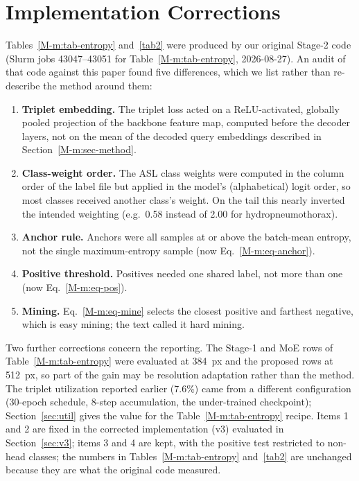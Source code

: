 \documentclass[conference]{IEEEtran}
\begin{document}
\section{Implementation Corrections}
\label{s:corr}\label{sec:corrections}
Tables~\ref{M-m:tab-entropy} and~\ref{tab2} were produced by our original Stage-2 code (Slurm jobs 43047--43051 for Table~\ref{M-m:tab-entropy}, 2026-08-27). An audit of that code against this paper found five differences, which we list rather than re-describe the method around them:
\begin{enumerate}
\item \textbf{Triplet embedding.} The triplet loss acted on a ReLU-activated, globally pooled projection of the backbone feature map, computed before the decoder layers, not on the mean of the decoded query embeddings described in Section~\ref{M-m:sec-method}.
\item \textbf{Class-weight order.} The ASL class weights were computed in the column order of the label file but applied in the model's (alphabetical) logit order, so most classes received another class's weight. On the tail this nearly inverted the intended weighting (e.g.\ 0.58 instead of 2.00 for hydropneumothorax).
\item \textbf{Anchor rule.} Anchors were all samples at or above the batch-mean entropy, not the single maximum-entropy sample (now Eq.~\ref{M-m:eq-anchor}).
\item \textbf{Positive threshold.} Positives needed one shared label, not more than one (now Eq.~\ref{M-m:eq-pos}).
\item \textbf{Mining.} Eq.~\ref{M-m:eq-mine} selects the closest positive and farthest negative, which is easy mining; the text called it hard mining.
\end{enumerate}
Two further corrections concern the reporting. The Stage-1 and MoE rows of Table~\ref{M-m:tab-entropy} were evaluated at 384~px and the proposed rows at 512~px, so part of the gain may be resolution adaptation rather than the method. The triplet utilization reported earlier (7.6\%) came from a different configuration (30-epoch schedule, 8-step accumulation, the under-trained checkpoint); Section~\ref{sec:util} gives the value for the Table~\ref{M-m:tab-entropy} recipe. Items 1 and 2 are fixed in the corrected implementation (v3) evaluated in Section~\ref{sec:v3}; items 3 and 4 are kept, with the positive test restricted to non-head classes; the numbers in Tables~\ref{M-m:tab-entropy} and~\ref{tab2} are unchanged because they are what the original code measured.
\end{document}
